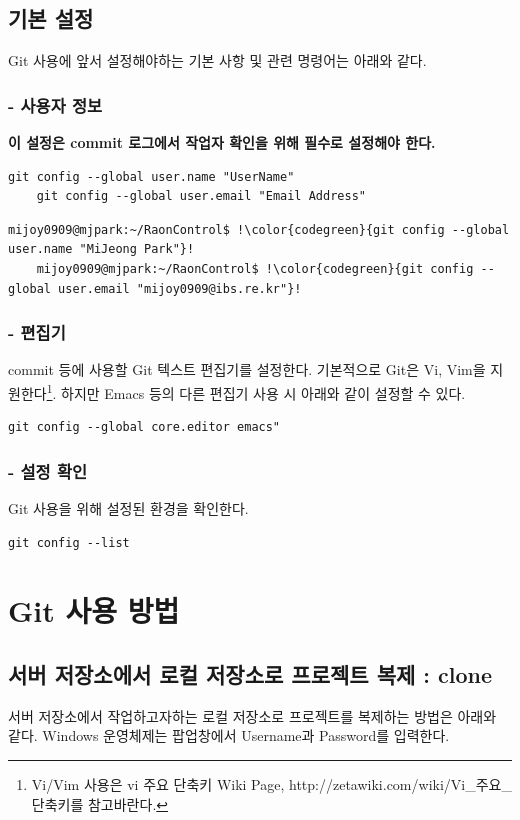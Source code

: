 \documentclass[11pt
  , a4paper
  , article
  , oneside
]{memoir}
\begin{document}
\subsection{기본 설정}
Git 사용에 앞서 설정해야하는 기본 사항 및 관련 명령어는 아래와 같다. 
\subsubsection{- 사용자 정보}
\small\textbf{이 설정은 commit 로그에서 작업자 확인을 위해 필수로 설정해야 한다.}	\begin{lstlisting}[style=termstyle, escapechar=!]	
	git config --global user.name "UserName" 
	git config --global user.email "Email Address" \end{lstlisting}
	
\begin{lstlisting}[style=termstyle, escapechar=!]
	mijoy0909@mjpark:~/RaonControl$ !\color{codegreen}{git config --global user.name "MiJeong Park"}!
	mijoy0909@mjpark:~/RaonControl$ !\color{codegreen}{git config --global user.email "mijoy0909@ibs.re.kr"}! \end{lstlisting}

\subsubsection{- 편집기}
	commit 등에 사용할 Git 텍스트 편집기를 설정한다. 기본적으로 Git은 Vi, Vim을 지원한다\footnote{Vi/Vim 사용은 vi 주요 단축키 Wiki Page, http://zetawiki.com/wiki/Vi\_주요\_단축키를 참고바란다.}. 하지만 Emacs 등의 다른 편집기 사용 시 아래와 같이 설정할 수 있다.
	\begin{lstlisting}[style=termstyle, escapechar=!]	
	git config --global core.editor emacs" \end{lstlisting}

\subsubsection{- 설정 확인}
Git 사용을 위해 설정된 환경을 확인한다.
	\begin{lstlisting}[style=termstyle, escapechar=!]	
	git config --list \end{lstlisting}

\section{Git 사용 방법}
\subsection{서버 저장소에서 로컬 저장소로 프로젝트 복제 : clone}
서버 저장소에서 작업하고자하는 로컬 저장소로 프로젝트를 복제하는 방법은 아래와 같다. Windows 운영체제는 팝업창에서 Username과 Password를 입력한다.
\end{document}
